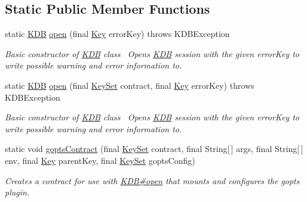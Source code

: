 \subsection*{Static Public Member Functions}
\begin{DoxyCompactItemize}
\item 
static \hyperlink{classorg_1_1libelektra_1_1KDB}{K\+DB} \hyperlink{classorg_1_1libelektra_1_1KDB_a75c66a69497a9e3fd7ec639ccd677817}{open} (final \hyperlink{classorg_1_1libelektra_1_1Key}{Key} error\+Key)  throws K\+D\+B\+Exception 	
\begin{DoxyCompactList}\small\item\em Basic constructor of \hyperlink{classorg_1_1libelektra_1_1KDB}{K\+DB} class~\newline
 Opens \hyperlink{classorg_1_1libelektra_1_1KDB}{K\+DB} session with the given error\+Key to write possible warning and error information to. \end{DoxyCompactList}\item 
static \hyperlink{classorg_1_1libelektra_1_1KDB}{K\+DB} \hyperlink{classorg_1_1libelektra_1_1KDB_aabb6b3695bfa7d90cd8003d245425bf8}{open} (final \hyperlink{classorg_1_1libelektra_1_1KeySet}{Key\+Set} contract, final \hyperlink{classorg_1_1libelektra_1_1Key}{Key} error\+Key)  throws K\+D\+B\+Exception 	
\begin{DoxyCompactList}\small\item\em Basic constructor of \hyperlink{classorg_1_1libelektra_1_1KDB}{K\+DB} class~\newline
 Opens \hyperlink{classorg_1_1libelektra_1_1KDB}{K\+DB} session with the given error\+Key to write possible warning and error information to. \end{DoxyCompactList}\item 
static void \hyperlink{classorg_1_1libelektra_1_1KDB_a4f1e5668d266af1e5baa440125fa5eb4}{gopts\+Contract} (final \hyperlink{classorg_1_1libelektra_1_1KeySet}{Key\+Set} contract, final String\mbox{[}$\,$\mbox{]} args, final String\mbox{[}$\,$\mbox{]} env, final \hyperlink{classorg_1_1libelektra_1_1Key}{Key} parent\+Key, final \hyperlink{classorg_1_1libelektra_1_1KeySet}{Key\+Set} gopts\+Config)
\begin{DoxyCompactList}\small\item\em Creates a contract for use with \hyperlink{classorg_1_1libelektra_1_1KDB_a75c66a69497a9e3fd7ec639ccd677817}{K\+D\+B\#open} that mounts and configures the gopts plugin. \end{DoxyCompactList}\end{DoxyCompactItemize}
